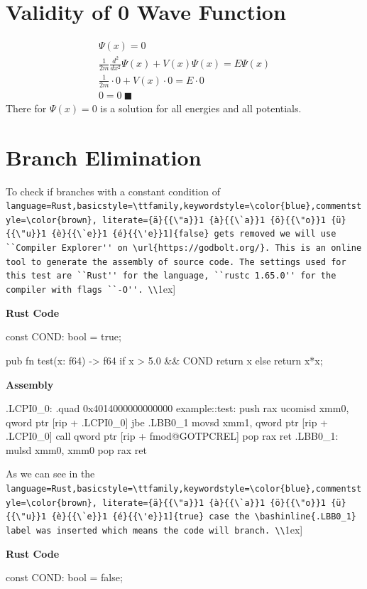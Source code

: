 \documentclass[11pt,DIV=10,final]{scrreprt} %
\providecommand{\rustinline}{\lstinline[language=Rust,basicstyle=\ttfamily,keywordstyle=\color{blue},commentstyle=\color{brown}, literate={ä}{{\"a}}1 {à}{{\`a}}1 {ö}{{\"o}}1 {ü}{{\"u}}1 {è}{{\`e}}1 {é}{{\'e}}1]} % für Inline-C++ Code
\providecommand{\bashinline}{\lstinline[language=bash,basicstyle=\ttfamily,keywordstyle=\color{blue},commentstyle=\color{brown}, literate={ä}{{\"a}}1 {à}{{\`a}}1 {ö}{{\"o}}1 {ü}{{\"u}}1 {è}{{\`e}}1 {é}{{\'e}}1]} % für Inline-C++ Code
\begin{document}
\begin{appendix}
{\section{Validity of 0 Wave Function}\label{proof:zero-wave-function}
\begin{align}
  \Psi(x) = 0 \\
  \frac{1}{2m} \frac{d^{2}}{dx^{2}}\Psi(x) + V(x) \Psi(x)  = E \Psi(x) \\
  \frac{1}{2m} \cdot 0 + V(x) \cdot 0 = E \cdot 0 \\
  0 = 0~\blacksquare
\end{align}
There for $\Psi(x) = 0$ is a solution for all energies and all potentials.
\section{Branch Elimination}\label{test:branch-elim}
To check if branches with a constant condition of \rustinline{false} gets removed we will use ``Compiler Explorer'' on \url{https://godbolt.org/}.
This is an online tool to generate the assembly of source code.
The settings used for this test are ``Rust'' for the language, ``rustc 1.65.0'' for the compiler with flags ``-O''.
\\[1ex]
\begin{paracol}{2}
{\noindent \bfseries Rust Code}
\begin{rustcode}[numbers=none]
const COND: bool = true;

pub fn test(x: f64) -> f64 {
    if x > 5.0 && COND {
        return x %
    } else {
        return x*x;
    }
}
\end{rustcode}
\switchcolumn
{\noindent \bfseries Assembly}
\begin{bashcode}[numbers=none]
.LCPI0_0:
        .quad   0x4014000000000000
example::test:
        push    rax
        ucomisd xmm0, qword ptr [rip + .LCPI0_0]
        jbe     .LBB0_1
        movsd   xmm1, qword ptr [rip + .LCPI0_0]
        call    qword ptr [rip + fmod@GOTPCREL]
        pop     rax
        ret
.LBB0_1:
        mulsd   xmm0, xmm0
        pop     rax
        ret
\end{bashcode}
\end{paracol}
As we can see in the \rustinline{true} case the \bashinline{.LBB0_1} label was inserted which means the code will branch.
\\[1ex]
\begin{paracol}{2}
{\noindent \bfseries Rust Code}
\begin{rustcode}[numbers=none]
const COND: bool = false;


\end{rustcode}
\end{paracol}}
\end{appendix}
\end{document}
